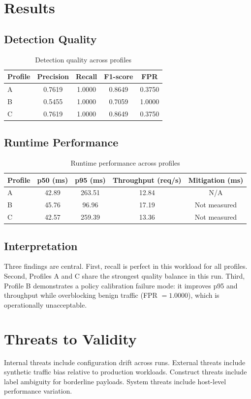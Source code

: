 \documentclass[conference]{IEEEtran}
\begin{document}
\section{Results}
\subsection{Detection Quality}
\begin{table}[htbp]
\caption{Detection quality across profiles}
\label{tab:detection}
\centering
\begin{tabular}{lcccc}
\toprule
Profile & Precision & Recall & F1-score & FPR \\
\midrule
A & 0.7619 & 1.0000 & 0.8649 & 0.3750 \\
B & 0.5455 & 1.0000 & 0.7059 & 1.0000 \\
C & 0.7619 & 1.0000 & 0.8649 & 0.3750 \\
\bottomrule
\end{tabular}
\end{table}

\subsection{Runtime Performance}
\begin{table}[htbp]
\caption{Runtime performance across profiles}
\label{tab:runtime}
\centering
\begin{tabular}{lcccc}
\toprule
Profile & p50 (ms) & p95 (ms) & Throughput (req/s) & Mitigation (ms) \\
\midrule
A & 42.89 & 263.51 & 12.84 & N/A \\
B & 45.76 & 96.96 & 17.19 & Not measured \\
C & 42.57 & 259.39 & 13.36 & Not measured \\
\bottomrule
\end{tabular}
\end{table}

\subsection{Interpretation}
Three findings are central. First, recall is perfect in this workload for all profiles. Second, Profiles A and C share the strongest quality balance in this run. Third, Profile B demonstrates a policy calibration failure mode: it improves p95 and throughput while overblocking benign traffic (FPR $=1.0000$), which is operationally unacceptable.

\section{Threats to Validity}
Internal threats include configuration drift across runs. External threats include synthetic traffic bias relative to production workloads. Construct threats include label ambiguity for borderline payloads. System threats include host-level performance variation.
\end{document}
